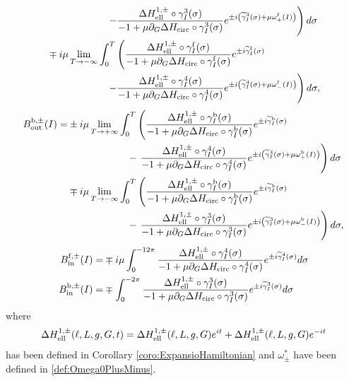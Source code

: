 \begin{lemma}
\begin{align}
    &\qquad\qquad\qquad\left.-\frac{\Delta H_{\mathrm{ell}}^{1,\pm}\circ\gamma_I^3(\sigma)}{-1+\mu\partial_G\Delta H_{\mathrm{circ}}\circ\gamma_I^3(\sigma)}e^{\pm i\left(\widetilde\gamma_I^3(\sigma)+\mu\omega_+^{\mathrm{f}}(I)\right)}\right) d\sigma\\
    &\mp i\mu\lim_{T\rightarrow-\infty}\int_0^T\left(\frac{\Delta H_{\mathrm{ell}}^{1,\pm}\circ\gamma_I^{\mathrm{f}}(\sigma)}{-1+\mu\partial_G\Delta H_{\mathrm{circ}}\circ\gamma_I^{\mathrm{f}}(\sigma)}e^{\pm i\widetilde\gamma_I^{\mathrm{f}}(\sigma)}\right.\nonumber\\
    &\qquad\qquad\qquad\left.-\frac{\Delta H_{\mathrm{ell}}^{1,\pm}\circ\gamma_I^4(\sigma)}{-1+\mu\partial_G\Delta H_{\mathrm{circ}}\circ\gamma_I^4(\sigma)}e^{\pm i\left(\widetilde\gamma_I^4(\sigma)+\mu\omega_-^{\mathrm{f}}(I)\right)}\right)d\sigma,\nonumber
\end{align}
\begin{align}\label{def:Omega:PlusMinus:back}
  B_{\mathrm{out}}^{\mathrm{b},\pm}(I)=&\pm i\mu\lim_{T\rightarrow+\infty}\int_0^T\left(\frac{ \Delta H^{1,\pm}_{\mathrm{ell}}\circ\gamma_I^{\mathrm{b}}(\sigma)}{-1+\mu\partial_G\Delta H_{\mathrm{circ}}\circ\gamma_I^{\mathrm{b}}(\sigma)}e^{\pm i\widetilde\gamma_I^{\mathrm{b}}(\sigma)}\right.\nonumber\\
    &\qquad\qquad\qquad-\left.\frac{\Delta H_{\mathrm{ell}}^{1,\pm}\circ\gamma_I^4(\sigma)}{-1+\mu\partial_G\Delta H_{\mathrm{circ}}\circ\gamma_I^4(\sigma)}e^{\pm i\left(\widetilde\gamma_I^4(\sigma)+\mu\omega_+^{\mathrm{b}}(I)\right)}\right)d\sigma\\
    &\mp i\mu\lim_{T\rightarrow-\infty}\int_0^T\left(\frac{ \Delta H_{\mathrm{ell}}^{1,\pm}\circ\gamma_I^{\mathrm{b}}(\sigma)}{-1+\mu\partial_G\Delta H_{\mathrm{circ}}\circ\gamma_I^{\mathrm{b}}(\sigma)}e^{\pm i\widetilde\gamma_I^{\mathrm{b}}(\sigma)}\right.\nonumber\\
    &\qquad\qquad\qquad-\left.\frac{ \Delta H_{\mathrm{ell}}^{1,\pm}\circ\gamma_I^3(\sigma)}{-1+\mu\partial_G\Delta H_{\mathrm{circ}}\circ\gamma_I^3(\sigma)}e^{\pm i\left(\widetilde\gamma_I^3(\sigma)+\mu\omega_-^{\mathrm{b}}(I)\right)}\right)d\sigma,\nonumber\\
\end{align}
\begin{align}\label{def:Omega:PlusMinus:Inn}
  B_{\mathrm{in}}^{\mathrm{f},\pm}(I)=&\mp i\mu\int_0^{-12\pi}\frac{\Delta H^{1,\pm}_{\mathrm{ell}}\circ\gamma_I^4(\sigma)}{-1+\mu\partial_G\Delta H_{\mathrm{circ}}\circ\gamma_I^4(\sigma)}e^{\pm i\widetilde\gamma_I^4(\sigma)}d\sigma\\
B_{\mathrm{in}}^{\mathrm{b},\pm}(I)=&\mp\int_0^{-2\pi}\frac{\Delta H^{1,\pm}_{\mathrm{ell}}\circ\gamma_I^3(\sigma)}{-1+\mu\partial_G\Delta H_{\mathrm{circ}}\circ\gamma_I^3(\sigma)}e^{\pm i\widetilde\gamma_I^3(\sigma)}d\sigma
   \end{align}
  where
  \[
  \Delta H_{\mathrm{ell}}^{1,\pm}(\ell,L,g,G,t)=\Delta H_{\mathrm{ell}}^{1,\pm}(\ell,L,g,G)e^{it}+\Delta H_{\mathrm{ell}}^{1,\pm}(\ell,L,g,G)e^{-it}
  \]
  has been defined in Corollary \ref{coro:ExpansioHamiltonian} and $\omega_\pm^\ast$ have been defined in \eqref{def:Omega0PlusMinus}.
\end{lemma}
